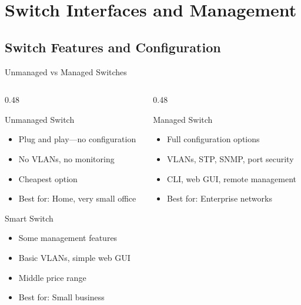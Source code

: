 \documentclass[aspectratio=169]{beamer}  %
\begin{document}
\section{Switch Interfaces and Management}
\subsection{Switch Features and Configuration}


\begin{frame}{Unmanaged vs Managed Switches}
    \begin{columns}[T]
        \begin{column}{0.48\textwidth}
            \begin{block}{Unmanaged Switch}
                \begin{itemize}
                    \item Plug and play---no configuration
                    \item No VLANs, no monitoring
                    \item Cheapest option
                    \item Best for: Home, very small office
                \end{itemize}
            \end{block}
            
            \vspace{0.3em}
            \begin{block}{Smart Switch}
                \begin{itemize}
                    \item Some management features
                    \item Basic VLANs, simple web GUI
                    \item Middle price range
                    \item Best for: Small business
                \end{itemize}
            \end{block}
        \end{column}
        \begin{column}{0.48\textwidth}
            \begin{block}{Managed Switch}
                \begin{itemize}
                    \item Full configuration options
                    \item VLANs, STP, SNMP, port security
                    \item CLI, web GUI, remote management
                    \item Best for: Enterprise networks
                \end{itemize}
            \end{block}
            

\end{column}
\end{columns}
\end{frame}
\end{document}
